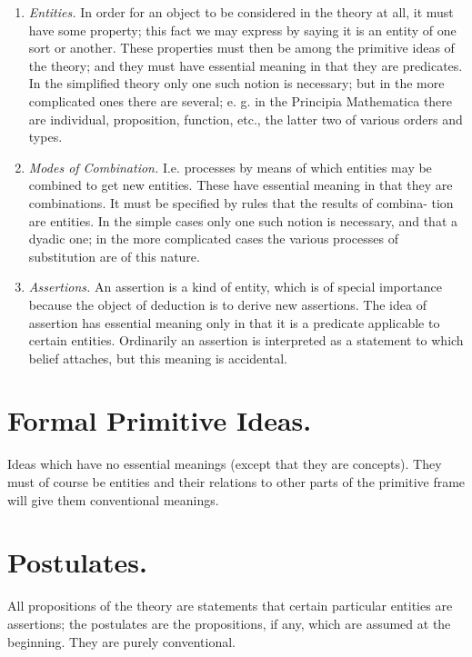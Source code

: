 \documentclass[10pt, twoside]{extarticle}
\newcommand\litem[1]{\item{\textit{#1}}}
\theoremstyle{breaktheorem}
\theoremstyle{mylemma}
\theoremstyle{mydefinition}
\theoremstyle{mycorollary}
\begin{document}
\begin{enumerate}[label=\arabic*.,font=\itshape,wide]
\litem{Entities.} In order for an object to be considered in the theory at
all, it must have some property; this fact we may express by saying it is
an entity of one sort or another. These properties must then be among the
primitive ideas of the theory; and they must have essential meaning in
that they are predicates. In the simplified theory only one such notion is
necessary; but in the more complicated ones there are several; e. g. in the
Principia Mathematica there are individual, proposition, function, etc., the
latter two of various orders and types.

\litem{Modes of Combination.} I.e. processes by means of which entities may
be combined to get new entities. These have essential meaning in that they
are combinations. It must be specified by rules that the results of combina-
tion are entities. In the simple cases only one such notion is necessary, and
that a dyadic one; in the more complicated cases the various processes of
substitution are of this nature.

\litem{Assertions.} An assertion is a kind of entity, which is of special
importance because the object of deduction is to derive new assertions. The
idea of assertion has essential meaning only in that it is a predicate applicable
to certain entities. Ordinarily an assertion is interpreted as a statement to
which belief attaches, but this meaning is accidental.
\end{enumerate}

\section{Formal Primitive Ideas.}
\indent Ideas which have no essential meanings (except that they are concepts).
They must of course be entities and their relations to other parts of the
primitive frame will give them conventional meanings.

\section{Postulates.}
\indent All propositions of the theory are statements that certain particular
entities are assertions; the postulates are the propositions, if any, which are
assumed at the beginning. They are purely conventional.
\end{document}
